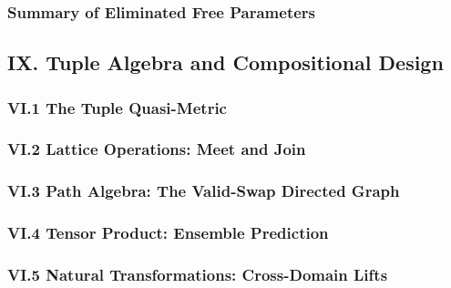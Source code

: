 \documentclass{article[11pt,letterpaper]}
\begin{document}

\subsubsection{Summary of Eliminated Free Parameters}
\label{sec:summary-of-eliminated-free-parameters}


\subsection{IX. Tuple Algebra and Compositional Design}
\label{sec:ix-tuple-algebra-and-compositional-design}


\subsubsection{VI.1 The Tuple Quasi-Metric}
\label{sec:vi1-the-tuple-quasi-metric}


\subsubsection{VI.2 Lattice Operations: Meet and Join}
\label{sec:vi2-lattice-operations-meet-and-join}


\subsubsection{VI.3 Path Algebra: The Valid-Swap Directed Graph}
\label{sec:vi3-path-algebra-the-valid-swap-directed-graph}


\subsubsection{VI.4 Tensor Product: Ensemble Prediction}
\label{sec:vi4-tensor-product-ensemble-prediction}


\subsubsection{VI.5 Natural Transformations: Cross-Domain Lifts}
\label{sec:vi5-natural-transformations-cross-domain-lifts}
\end{document}
